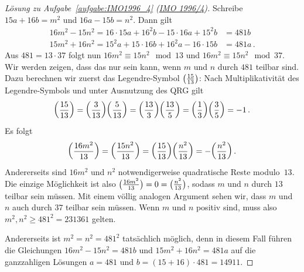 \begin{proof}[Lösung zu Aufgabe~\ref{aufgabe:IMO1996_4} \textmd{(\href{https://artofproblemsolving.com/community/c3823_1996_imo}{IMO 1996/4})}]
	Schreibe $15a+16b=m^2$ und $16a-15b=n^2$. Dann gilt
	\begin{align*}
		16m^2-15n^2=16\cdot 15a+16^2b-15\cdot 16a+15^2b&=481b\\
		15m^2+16n^2=15^2a+15\cdot 16b+ 16^2a-16\cdot 15b&=481a\,.
	\end{align*}
	Aus $481=13\cdot 37$ folgt nun $16m^2\equiv 15n^2\mod 13$ und $16m^2\equiv 15n^2\mod 37$. Wir werden zeigen, dass das nur sein kann, wenn $m$ und $n$ durch $481$ teilbar sind. Dazu berechnen wir zuerst das Legendre-Symbol $\parens[\big]{\frac{15}{13}}$: Nach Multiplikativität des Legendre-Symbols und unter Ausnutzung des QRG gilt
	\begin{equation*}
		\parens*{\frac{15}{13}}= \parens*{\frac{3}{13}}\parens*{\frac{5}{13}}=\parens*{\frac{13}{3}}\parens*{\frac{13}{5}}=\parens*{\frac{1}{3}}\parens*{\frac{3}{5}}=-1\,.
	\end{equation*}
	Es folgt
	\begin{equation*}
		\parens*{\frac{16m^2}{13}}=\parens*{\frac{15n^2}{13}}=\parens*{\frac{15}{13}}\parens*{\frac{n^2}{13}}=-\parens*{\frac{n^2}{13}}\,.
	\end{equation*}
	Andererseits sind $16m^2$ und $n^2$ notwendigerweise quadratische Reste modulo~$13$. Die einzige Möglichkeit ist also $\parens[\big]{\frac{16m^2}{13}}=0=\parens[\big]{\frac{n^2}{13}}$, sodass $m$ und $n$ durch $13$ teilbar sein müssen. Mit einem völlig analogen Argument sehen wir, dass $m$ und $n$ auch durch $37$ teilbar sein müssen. Wenn $m$ und $n$ positiv sind, muss also $m^2,n^2\geqslant 481^2=231361$ gelten.
	
	Andererseits ist $m^2=n^2=481^2$ tatsächlich möglich, denn in diesem Fall führen die Gleichungen $16m^2-15n^2=481b$ und $15m^2+16n^2=481a$ auf die ganzzahligen Lösungen $a=481$ und $b=(15+16)\cdot 481=14911$.
\end{proof}

